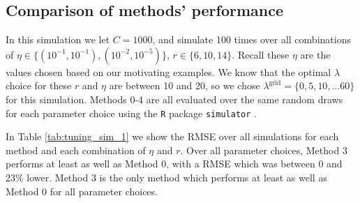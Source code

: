 \documentclass[12pt]{article}
\newcommand{\lambdagrid}{\lambda^{\text{grid}}}
\theoremstyle{break}
\theoremstyle{break}
\begin{document}


\subsection{Comparison of methods' performance}
\label{sec:tuning_simulation_1}


In this simulation we let $C = 1000$, and simulate 100 times over all combinations of $\eta \in \{(10^{-1}, 10^{-1}), (10^{-2}, 10^{-5}) \}$, $r \in \{6, 10, 14\}$.  Recall these $\eta$ are the values chosen based on our motivating examples.  We know that the optimal $\lambda$ choice for these $r$ and $\eta$ are between 10 and 20, so we chose $\lambdagrid = \{0, 5, 10, \dots 60\}$ for this simulation.  Methods 0-4 are all evaluated over the same random draws for each parameter choice using the \texttt{R}
package \texttt{simulator} \citep{Bien:2016tg}.


In Table \ref{tab:tuning_sim_1} we show the RMSE over all simulations for each method and each combination of $\eta$ and $r$.  Over all parameter choices, Method 3 performs at least as well as Method 0, with a RMSE which was between 0 and 23\% lower.  Method 3 is the only method which performs at least as well as Method 0 for all parameter choices.
\end{document}
